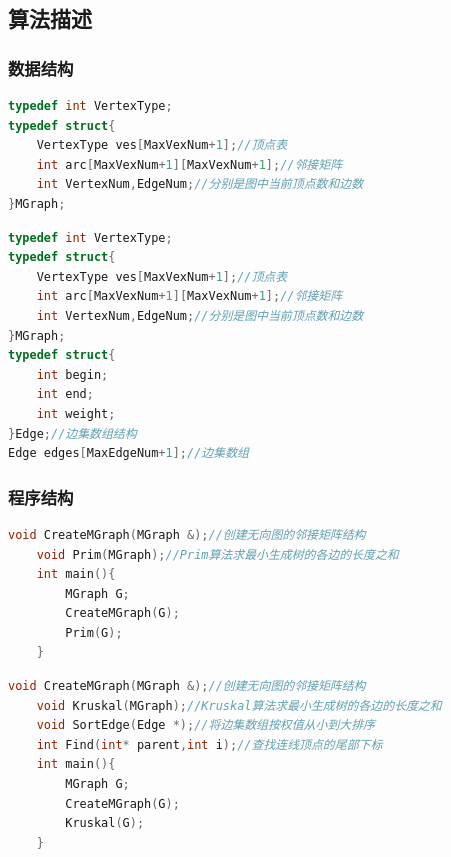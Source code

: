\documentclass{ctexart}
\begin{document}
\subsection{算法描述}

\subsubsection{数据结构}
\begin{lstlisting}[language=C++, caption=数据结构(Prim)]
	typedef int VertexType;
typedef struct{
    VertexType ves[MaxVexNum+1];//顶点表
    int arc[MaxVexNum+1][MaxVexNum+1];//邻接矩阵
    int VertexNum,EdgeNum;//分别是图中当前顶点数和边数
}MGraph;
\end{lstlisting}
\begin{lstlisting}[language=C++, caption=数据结构(Kruskal)]
	typedef int VertexType;
typedef struct{
    VertexType ves[MaxVexNum+1];//顶点表
    int arc[MaxVexNum+1][MaxVexNum+1];//邻接矩阵
    int VertexNum,EdgeNum;//分别是图中当前顶点数和边数
}MGraph;
typedef struct{
	int begin;
	int end;
	int weight;
}Edge;//边集数组结构
Edge edges[MaxEdgeNum+1];//边集数组	
\end{lstlisting}
\subsubsection{程序结构}
\begin{lstlisting}[language=C++, caption=程序结构(Prim)]
	void CreateMGraph(MGraph &);//创建无向图的邻接矩阵结构
	void Prim(MGraph);//Prim算法求最小生成树的各边的长度之和
	int main(){
		MGraph G;
		CreateMGraph(G);
		Prim(G);
	}
\end{lstlisting}
\begin{lstlisting}[language=C++, caption=程序结构(Kruskal)]
	void CreateMGraph(MGraph &);//创建无向图的邻接矩阵结构
	void Kruskal(MGraph);//Kruskal算法求最小生成树的各边的长度之和
	void SortEdge(Edge *);//将边集数组按权值从小到大排序
	int Find(int* parent,int i);//查找连线顶点的尾部下标
	int main(){
		MGraph G;
		CreateMGraph(G);
		Kruskal(G);
	}
\end{lstlisting}
\end{document}
